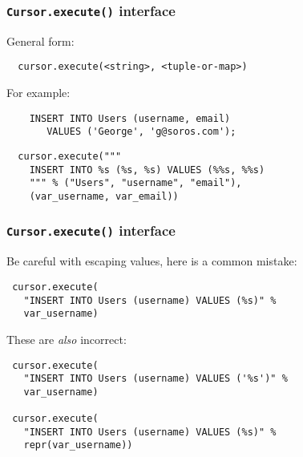 \documentclass{beamer}
\begin{document}
\begin{frame}[fragile]
  \frametitle{\texttt{Cursor.execute()} interface}

  General form:
\begin{verbatim}
  cursor.execute(<string>, <tuple-or-map>)
\end{verbatim}

\vfill

  For example:

\begin{verbatim}
    INSERT INTO Users (username, email) 
       VALUES ('George', 'g@soros.com');
\end{verbatim}

\begin{verbatim}
  cursor.execute("""
    INSERT INTO %s (%s, %s) VALUES (%%s, %%s)
    """ % ("Users", "username", "email"),
    (var_username, var_email))
\end{verbatim}

\end{frame}


\begin{frame}[fragile]
  \frametitle{\texttt{Cursor.execute()} interface}

  Be careful with escaping values, here is a common mistake:
\begin{verbatim}
 cursor.execute(
   "INSERT INTO Users (username) VALUES (%s)" % 
   var_username)
\end{verbatim}

  These are \emph{also} incorrect:
\begin{verbatim}
 cursor.execute(
   "INSERT INTO Users (username) VALUES ('%s')" % 
   var_username)

 cursor.execute(
   "INSERT INTO Users (username) VALUES (%s)" % 
   repr(var_username))
\end{verbatim}

\end{frame}
\end{document}
